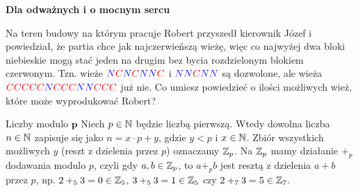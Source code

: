 \documentclass{article}
\begin{document}
\textbf{\large Dla odważnych i o mocnym sercu}

\begin{zadanie}
  Na teren budowy na którym pracuje Robert przyszedł kierownik Józef i powiedział, że partia chce jak najczerwieńszą wieżę, więc co najwyżej dwa bloki niebieskie mogą stać jeden na drugim bez bycia rozdzielonym blokiem czerwonym. Tzn. wieże $\color{blue}N\color{red}C\color{blue}N\color{red}C\color{blue}N\color{blue}N\color{red}C$ i $\color{blue}N\color{blue}N\color{red}C\color{blue}N\color{blue}N$ są dozwolone, ale wieża $\color{red}C\color{red}C\color{red}C\color{red}C\color{red}C\color{blue}N\color{red}C\color{red}C\color{red}C\color{blue}N\color{blue}N\color{red}C\color{red}C\color{red}C$ już nie. Co umiesz powiedzieć o ilości możliwych wież, które może wyprodukować Robert? 
\end{zadanie}

\begin{mybox}{Liczby modulo $\boldsymbol{p}$}
  Niech $p\in\mathbb{N}$ będzie liczbą pierwszą. Wtedy dowolna liczba $n\in\mathbb{N}$ zapisuje się jako $n=x\cdot p + y$, gdzie $y<p$ i $x\in\mathbb{N}$. Zbiór wszystkich możliwych $y$ (reszt z dzielenia przez $p$) oznaczamy $\mathbb{Z}_p$. Na $\mathbb{Z}_p$ mamy działanie $+_p$ dodawania modulo $p$, czyli gdy $a,b\in\mathbb{Z}_p$, to $a+_pb$ jest resztą z dzielenia $a+b$ przez $p$, np. $2+_53=0\in\mathbb{Z}_5$, $3+_53=1\in\mathbb{Z}_5$ czy $2+_73=5\in\mathbb{Z}_7$.
\end{mybox}
\end{document}
